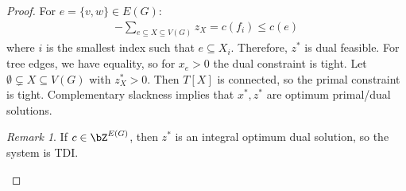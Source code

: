 \documentclass[11pt, a4paper]{article}
\newcommand{\set}[1]{\{#1\}}
\theoremstyle{remark}
\newtheorem*{uremark}{Remark}
\theoremstyle{definition}
\begin{document}
\begin{proof}
	For $e=\set{v,w}\in E(G)$:
	\begin{align*}
		-\sum_{e\subseteq X\subseteq V(G)}z_X=c(f_i)\leq c(e)
	\end{align*}
	where $i$ is the smallest index such that $e\subseteq X_i$. Therefore, $z^*$
	is dual feasible. For tree edges, we have equality, so for $x_e>0$ the
	dual constraint is tight. Let $\emptyset\subsetneq X\subseteq V(G)$
	with $z^*_X>0$. Then $T[X]$ is connected, so the primal constraint is
	tight. Complementary slackness implies that $x^*,z^*$ are optimum
	primal/dual solutions.

	\begin{uremark}
		If $c\in\bZ^{E(G)}$, then $z^*$ is an integral optimum dual
		solution, so the system is TDI.
	\end{uremark}
\end{proof}
\end{document}
